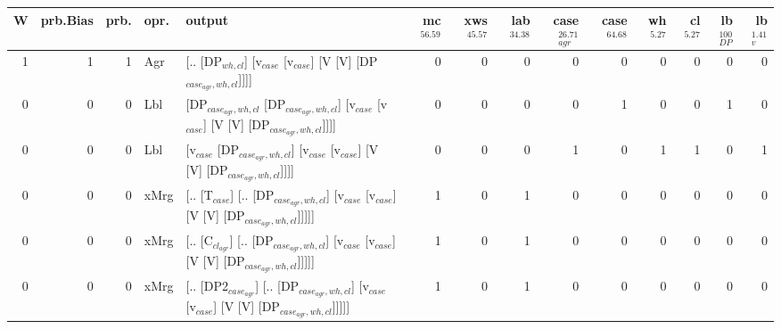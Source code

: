 \begin{tabularx}{\linewidth}{rrrlXrrrrrrrrr}
\hline
   W &   prb.Bias &   prb. & opr.   & output                                                                                                                    &   mc$^{56.59}$ &   xws$^{45.57}$ &   lab$^{34.38}$ &   case$_{agr}^{26.71}$ &   case$^{64.68}$ &   wh$^{5.27}$ &   cl$^{5.27}$ &   lb$_{DP}^{100}$ &   lb$_{v}^{1.41}$ \\
\hline
   1 &       1 &   1 & Agr  & [.. [DP$_{wh,cl}$] [v$_{case}$ [v$_{case}$] [V [V] [DP$_{case_{agr},wh,cl}$]]]]                                                             &            0 &             0 &             0 &                  0 &              0 &           0 &           0 &                0 &             0 \\
   0 &       0 &   0 & Lbl  & [DP$_{case_{agr},wh,cl}$ [DP$_{case_{agr},wh,cl}$] [v$_{case}$ [v$_{case}$] [V [V] [DP$_{case_{agr},wh,cl}$]]]]                                     &            0 &             0 &             0 &                  0 &              1 &           0 &           0 &                1 &             0 \\
   0 &       0 &   0 & Lbl  & [v$_{case}$ [DP$_{case_{agr},wh,cl}$] [v$_{case}$ [v$_{case}$] [V [V] [DP$_{case_{agr},wh,cl}$]]]]                                                &            0 &             0 &             0 &                  1 &              0 &           1 &           1 &                0 &             1 \\
   0 &       0 &   0 & xMrg & [.. [T$_{case}$] [.. [DP$_{case_{agr},wh,cl}$] [v$_{case}$ [v$_{case}$] [V [V] [DP$_{case_{agr},wh,cl}$]]]]]                                      &            1 &             0 &             1 &                  0 &              0 &           0 &           0 &                0 &             0 \\
   0 &       0 &   0 & xMrg & [.. [C$_{cl_{agr}}$] [.. [DP$_{case_{agr},wh,cl}$] [v$_{case}$ [v$_{case}$] [V [V] [DP$_{case_{agr},wh,cl}$]]]]]                                    &            1 &             0 &             1 &                  0 &              0 &           0 &           0 &                0 &             0 \\
   0 &       0 &   0 & xMrg & [.. [DP2$_{case_{agr}}$] [.. [DP$_{case_{agr},wh,cl}$] [v$_{case}$ [v$_{case}$] [V [V] [DP$_{case_{agr},wh,cl}$]]]]]                                &            1 &             0 &             1 &                  0 &              0 &           0 &           0 &                0 &             0 \\

\end{tabularx}
